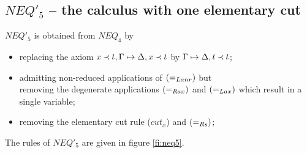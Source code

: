 \subsection{$NEQ'_5$ -- the calculus with one elementary cut}\label{sub:onecut}
\begin{DEFINITION}\label{de:neq5}
 $NEQ'_5$ is obtained from $NEQ_4$ by 
\begin{itemize}\MyLPar
\item replacing the axiom $x\mathbin{\prec} t,\Gamma\mathrel{\mapsto}\Delta,x\mathbin{\prec} t$ by $\Gamma\mathrel{\mapsto}\Delta,t\mathbin{\prec} t$;
\item admitting non-reduced applications of $(=_{Lanr})$ but \\
 removing the degenerate applications $(=_{Rax})$ and $(=_{Lax})$ which result in a single 
variable; %
\item removing the elementary cut rule ($cut_x$) and $(=_{Rs})$;
\end{itemize}
\end{DEFINITION}
\noindent
The rules of $NEQ'_5$ are given in figure \ref{fi:neq5}.

